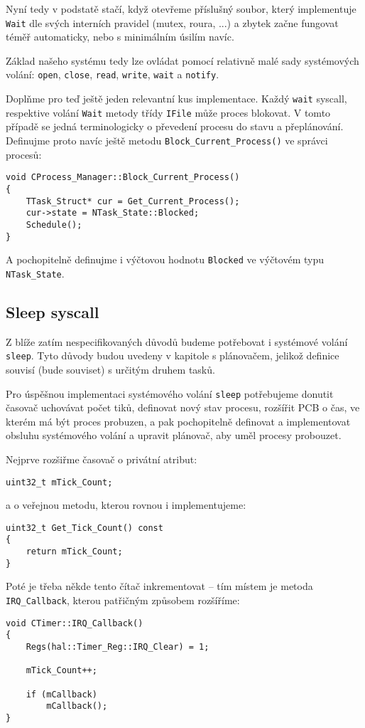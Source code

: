 \documentclass{article}
\begin{document}
Nyní tedy v podstatě stačí, když otevřeme příslušný soubor, který implementuje \texttt{Wait} dle svých interních pravidel (mutex, roura, ...) a zbytek začne fungovat téměř automaticky, nebo s minimálním úsilím navíc.

Základ našeho systému tedy lze ovládat pomocí relativně malé sady systémových volání: \texttt{open}, \texttt{close}, \texttt{read}, \texttt{write}, \texttt{wait} a \texttt{notify}.

Doplňme pro teď ještě jeden relevantní kus implementace. Každý \texttt{wait} syscall, respektive volání \texttt{Wait} metody třídy \texttt{IFile} může proces blokovat. V tomto případě se jedná terminologicky o převedení procesu do stavu  a přeplánování. Definujme proto navíc ještě metodu \texttt{Block\_Current\_Process()} ve správci procesů:
\begin{lstlisting}
void CProcess_Manager::Block_Current_Process()
{
	TTask_Struct* cur = Get_Current_Process();
	cur->state = NTask_State::Blocked;
	Schedule();
}
\end{lstlisting}
A pochopitelně definujme i výčtovou hodnotu \texttt{Blocked} ve výčtovém typu \texttt{NTask\_State}.

\subsection{Sleep syscall}

Z blíže zatím nespecifikovaných důvodů budeme potřebovat i systémové volání \texttt{sleep}. Tyto důvody budou uvedeny v kapitole s plánovačem, jelikož definice souvisí (bude souviset) s určitým druhem tasků.

Pro úspěšnou implementaci systémového volání \texttt{sleep} potřebujeme donutit časovač uchovávat počet tiků, definovat nový stav procesu, rozšířit PCB o čas, ve kterém má být proces probuzen, a pak pochopitelně definovat a implementovat obsluhu systémového volání a upravit plánovač, aby uměl procesy probouzet.

Nejprve rozšiřme časovač o privátní atribut:
\begin{lstlisting}
uint32_t mTick_Count;
\end{lstlisting}
a o veřejnou metodu, kterou rovnou i implementujeme:
\begin{lstlisting}
uint32_t Get_Tick_Count() const
{
	return mTick_Count;
}
\end{lstlisting}
Poté je třeba někde tento čítač inkrementovat -- tím místem je metoda \texttt{IRQ\_Callback}, kterou patřičným způsobem rozšíříme:
\begin{lstlisting}
void CTimer::IRQ_Callback()
{
    Regs(hal::Timer_Reg::IRQ_Clear) = 1;

    mTick_Count++;
	
    if (mCallback)
        mCallback();
}
\end{lstlisting}
\end{document}
